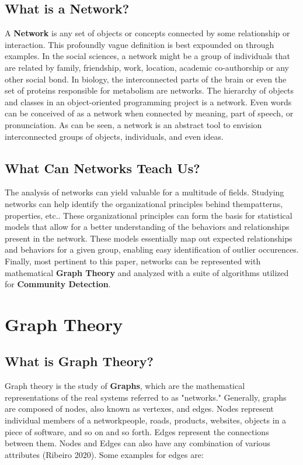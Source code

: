 \documentclass{article}
\begin{document}
\subsection{What is a Network?}
A \textbf{Network} is any set of objects or concepts connected by some relationship or interaction. This profoundly vague definition is best expounded on through examples. In the social sciences, a network
might be a group of individuals that are related by family, friendship, work, location, academic co-authorship or any other social bond. In biology, the interconnected parts of the brain or even the set of proteins responsible for metabolism are networks. 
The hierarchy of objects and classes in an object-oriented programming project is a network. Even words can be conceived of as a network when connected by meaning, part of speech, or pronunciation. As can be seen, a network is an abstract tool to envision 
interconnected groups of objects, individuals, and even ideas.   

\subsection{What Can Networks Teach Us?}
The analysis of networks can yield valuable for a multitude of fields. Studying networks can help identify the organizational principles behind them\textemdash patterns, properties, etc.. These organizational principles can form the basis for statistical models
that allow for a better understanding of the behaviors and relationships present in the network. These models essentially map out expected relationships and behaviors for a given group, enabling easy identification of outlier occurences. Finally, most pertinent to this paper,
networks can be represented with mathematical \textbf{Graph Theory} and analyzed with a suite of algorithms utilized for \textbf{Community Detection}.

\section{Graph Theory}

\subsection{What is Graph Theory?}
Graph theory is the study of \textbf{Graphs}, which are the  mathematical representations of the real systems referred to as "networks." Generally, graphs are composed of nodes, also known as vertexes, and edges.
Nodes represent individual members of a network\textemdash people, roads, products, websites, objects in a piece of software, and so on and so forth. Edges represent the connections between them.
Nodes and Edges can also have any combination of various attributes (Ribeiro 2020). Some examples for edges are:
\end{document}
